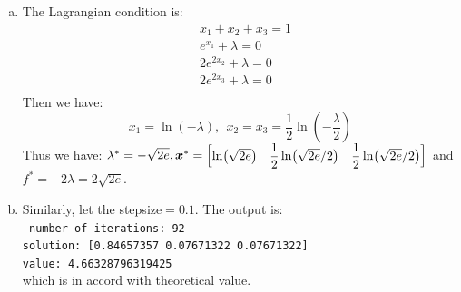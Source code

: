 \documentclass{article}
\def\bx{\boldsymbol{x}}
\begin{document}
\begin{enumerate}[(a)]
    \item
		The Lagrangian condition is:
		\[
		    \begin{aligned}
		        &x_1+x_2+x_3=1 \\
				&e^{x_1}+\lambda=0 \\
				&2e^{2x_2}+\lambda=0 \\
				&2e^{2x_3}+\lambda=0 \\
		    \end{aligned}
		\]
		Then we have:
		\[
			x_1=\ln(-\lambda),\ \ 
			x_2=x_3=\frac{1}{2}\ln(-\frac{\lambda}{2})
		\]
		Thus we have: 
		$
		\lambda^*=-\sqrt{2e},
		\bx^*=\mqty[\ln(\sqrt{2e}) & \dfrac{1}{2}\ln(\sqrt{2e}/2) & \dfrac{1}{2}\ln(\sqrt{2e}/2)]
		$
		and $f^*=-2\lambda=2\sqrt{2e}$.
    \item
		Similarly, let the stepsize$=0.1$. The output is:\\
		\texttt{
			number of iterations: 92 \\
			solution: [0.84657357 0.07671322 0.07671322] \\
			value: 4.66328796319425
		}\\
		which is in accord with theoretical value.
\end{enumerate}
\end{document}

